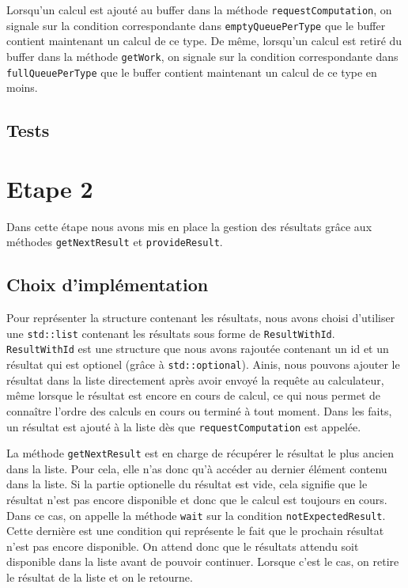 \documentclass{article}
\begin{document}
Lorsqu'un calcul est ajouté au buffer dans la méthode \texttt{requestComputation}, on signale sur la condition correspondante
dans \texttt{emptyQueuePerType} que le buffer contient maintenant un calcul de ce type. De même, lorsqu'un calcul est
retiré du buffer dans la méthode \texttt{getWork}, on signale sur la condition correspondante dans \texttt{fullQueuePerType}
que le buffer contient maintenant un calcul de ce type en moins.
\subsection{Tests}

\section{Etape 2}
Dans cette étape nous avons mis en place la gestion des résultats grâce aux méthodes \texttt{getNextResult} et
\texttt{provideResult}.
\subsection{Choix d'implémentation}
Pour représenter la structure contenant les résultats, nous avons choisi d'utiliser une \texttt{std::list} contenant les
résultats sous forme de \texttt{ResultWithId}. \texttt{ResultWithId} est une structure que nous avons rajoutée
contenant un id et un résultat qui est optionel (grâce à \texttt{std::optional}). Ainis, nous pouvons ajouter le
résultat dans la liste directement après avoir envoyé la requête au calculateur, même lorsque le résultat est encore
en cours de calcul, ce qui nous permet de connaître l'ordre des calculs en cours ou terminé à tout moment. Dans les
faits, un résultat est ajouté à la liste dès que \texttt{requestComputation} est appelée.

La méthode \texttt{getNextResult} est en charge de récupérer le résultat le plus ancien dans la liste. Pour cela, elle
n'as donc qu'à accéder au dernier élément contenu dans la liste. Si la partie optionelle du résultat est vide, cela
signifie que le résultat n'est pas encore disponible et donc que le calcul est toujours en cours. Dans ce cas, on
appelle la méthode \texttt{wait} sur la condition \texttt{notExpectedResult}. Cette dernière est une condition qui
représente le fait que le prochain résultat n'est pas encore disponible. On attend donc que le résultats attendu
soit disponible dans la liste avant de pouvoir continuer. Lorsque c'est le cas, on retire le résultat de la liste et
on le retourne.
\end{document}
